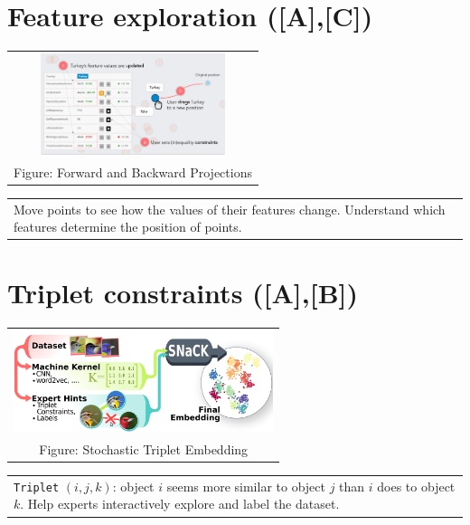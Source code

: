 \documentclass[portrait,final,a0paper]{nadiposter}
\newcommand{\pointer}{\scalebox{1.0}{\ding{43}}}%
\begin{document}
\begin{poster}
{\begin{multicols}{3}
    \section*{\small{Feature exploration ([A],[C])}}
    \begin{center}
        \begin{tabular}{c}
            \includegraphics[height=8em]{poster_NADI_2018/images/eg_forward_backward.png}\\
            \tiny{Figure: Forward and Backward Projections \cite{cavallo2017FWBW}}
        \end{tabular}
        \begin{tabular}{p{20em}}
            Move points to see how the values of their features change.
            \pointer
            Understand which features determine the position of points.%
        \end{tabular}
    \end{center}

    \section*{\small{Triplet constraints ([A],[B])}}
    \begin{center}
        \begin{tabular}{c}
            \includegraphics[height=8em]{poster_NADI_2018/images/eg_triplet.png}\\
            \tiny{Figure: Stochastic Triplet Embedding \cite{van2012ste}}
        \end{tabular}
        \begin{tabular}{p{22em}}
            \quad\texttt{Triplet} $(i, j, k)$: object $i$ seems more similar to object $j$ than $i$ does to object $k$.
            \pointer
            Help experts interactively explore and label the dataset.
        \end{tabular}
    \end{center}


\end{multicols}}
\end{poster}
\end{document}
